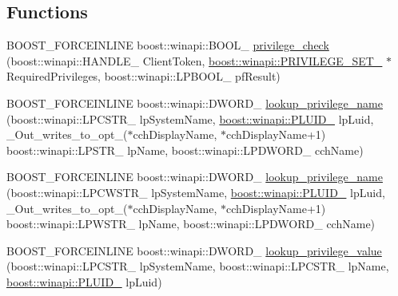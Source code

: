 \subsection*{Functions}
\begin{DoxyCompactItemize}
\item 
B\+O\+O\+S\+T\+\_\+\+F\+O\+R\+C\+E\+I\+N\+L\+I\+NE boost\+::winapi\+::\+B\+O\+O\+L\+\_\+ \mbox{\hyperlink{namespaceboost_1_1winapi_a90dba32b60ec45a25dfcebada9f019e3}{privilege\+\_\+check}} (boost\+::winapi\+::\+H\+A\+N\+D\+L\+E\+\_\+ Client\+Token, \mbox{\hyperlink{namespaceboost_1_1winapi_ad5c3207ffbe8cc6eb36b1f28897f2711}{boost\+::winapi\+::\+P\+R\+I\+V\+I\+L\+E\+G\+E\+\_\+\+S\+E\+T\+\_\+}} $\ast$Required\+Privileges, boost\+::winapi\+::\+L\+P\+B\+O\+O\+L\+\_\+ pf\+Result)
\item 
B\+O\+O\+S\+T\+\_\+\+F\+O\+R\+C\+E\+I\+N\+L\+I\+NE boost\+::winapi\+::\+D\+W\+O\+R\+D\+\_\+ \mbox{\hyperlink{namespaceboost_1_1winapi_a04260de54170aeb1e2b06c889e5f9a15}{lookup\+\_\+privilege\+\_\+name}} (boost\+::winapi\+::\+L\+P\+C\+S\+T\+R\+\_\+ lp\+System\+Name, \mbox{\hyperlink{namespaceboost_1_1winapi_a9c163fdf2c6f3909b7d5af5652bc6727}{boost\+::winapi\+::\+P\+L\+U\+I\+D\+\_\+}} lp\+Luid, \+\_\+\+Out\+\_\+writes\+\_\+to\+\_\+opt\+\_\+($\ast$cch\+Display\+Name, $\ast$cch\+Display\+Name+1) boost\+::winapi\+::\+L\+P\+S\+T\+R\+\_\+ lp\+Name, boost\+::winapi\+::\+L\+P\+D\+W\+O\+R\+D\+\_\+ cch\+Name)
\item 
B\+O\+O\+S\+T\+\_\+\+F\+O\+R\+C\+E\+I\+N\+L\+I\+NE boost\+::winapi\+::\+D\+W\+O\+R\+D\+\_\+ \mbox{\hyperlink{namespaceboost_1_1winapi_a0c424379b531014655423109a507ad29}{lookup\+\_\+privilege\+\_\+name}} (boost\+::winapi\+::\+L\+P\+C\+W\+S\+T\+R\+\_\+ lp\+System\+Name, \mbox{\hyperlink{namespaceboost_1_1winapi_a9c163fdf2c6f3909b7d5af5652bc6727}{boost\+::winapi\+::\+P\+L\+U\+I\+D\+\_\+}} lp\+Luid, \+\_\+\+Out\+\_\+writes\+\_\+to\+\_\+opt\+\_\+($\ast$cch\+Display\+Name, $\ast$cch\+Display\+Name+1) boost\+::winapi\+::\+L\+P\+W\+S\+T\+R\+\_\+ lp\+Name, boost\+::winapi\+::\+L\+P\+D\+W\+O\+R\+D\+\_\+ cch\+Name)
\item 
B\+O\+O\+S\+T\+\_\+\+F\+O\+R\+C\+E\+I\+N\+L\+I\+NE boost\+::winapi\+::\+D\+W\+O\+R\+D\+\_\+ \mbox{\hyperlink{namespaceboost_1_1winapi_ac0088225aa92fe84699d2a723816566d}{lookup\+\_\+privilege\+\_\+value}} (boost\+::winapi\+::\+L\+P\+C\+S\+T\+R\+\_\+ lp\+System\+Name, boost\+::winapi\+::\+L\+P\+C\+S\+T\+R\+\_\+ lp\+Name, \mbox{\hyperlink{namespaceboost_1_1winapi_a9c163fdf2c6f3909b7d5af5652bc6727}{boost\+::winapi\+::\+P\+L\+U\+I\+D\+\_\+}} lp\+Luid)
\item 

\end{DoxyCompactItemize}
